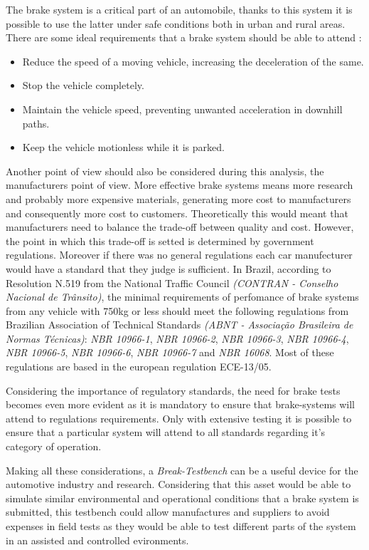 		The brake system is a critical part of an automobile, thanks to this system it is possible to use the latter under safe conditions both in urban and rural areas. There are some ideal requirements that a brake system should be able to attend \cite{kawaguchi}:

		\begin{itemize}
			\item Reduce the speed of a moving vehicle, increasing the deceleration of the same.
			\item Stop the vehicle completely.
			\item Maintain the vehicle speed, preventing unwanted acceleration in downhill paths.
			\item Keep the vehicle motionless while it is parked.
		\end{itemize}

		\par
		Another point of view should also be considered during this analysis, the manufacturers point of view. More effective brake systems means more research and probably more expensive materials, generating more cost to manufacturers and consequently more cost to customers. Theoretically this would meant that manufacturers need to balance the trade-off between quality and cost. However, the point in which this trade-off is setted is determined by government regulations. Moreover if there was no general regulations each car manufecturer would have a standard that they judge is sufficient. In Brazil, according to Resolution N.519 \cite{contran519} from the National Traffic Council \textit{(CONTRAN - Conselho Nacional de Trânsito)}, the minimal requirements of perfomance of brake systems from any vehicle with 750kg or less should meet the following regulations from Brazilian Association of Technical Standards \textit{(ABNT - Associação Brasileira de Normas Técnicas)}: \textit{NBR 10966-1}, \textit{NBR 10966-2}, \textit{NBR 10966-3}, \textit{NBR 10966-4}, \textit{NBR 10966-5}, \textit{NBR 10966-6}, \textit{NBR 10966-7} and \textit{NBR 16068}. Most of these regulations are based in the european regulation ECE-13/05.
		\par
		Considering the importance of regulatory standards, the need for brake tests becomes even more evident as it is mandatory to ensure that brake-systems will attend to regulations requirements. Only with extensive testing it is possible to ensure that a particular system will attend to all standards regarding it's category of operation. 
		\par
		Making all these considerations, a \textit{Break-Testbench} can be a useful device for the automotive industry and research. Considering that this asset would be able to simulate similar environmental and operational conditions that a brake system is submitted, this testbench could allow manufactures and suppliers to avoid expenses in field tests as they would be able to test different parts of the system in an assisted and controlled evironments.